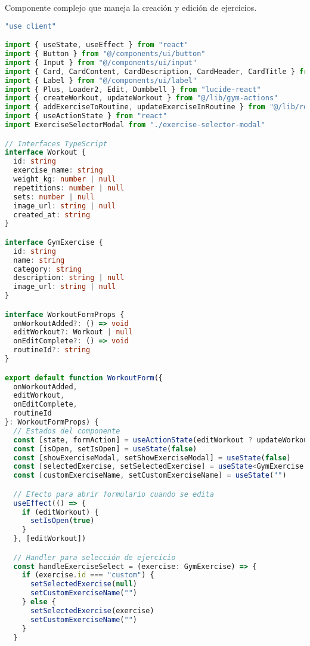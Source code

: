\documentclass[12pt,a4paper]{article}
\begin{document}
Componente complejo que maneja la creación y edición de ejercicios.

\begin{lstlisting}[language=typescript, caption=components/gym/workout-form.tsx - Estructura principal]
"use client"

import { useState, useEffect } from "react"
import { Button } from "@/components/ui/button"
import { Input } from "@/components/ui/input"
import { Card, CardContent, CardDescription, CardHeader, CardTitle } from "@/components/ui/card"
import { Label } from "@/components/ui/label"
import { Plus, Loader2, Edit, Dumbbell } from "lucide-react"
import { createWorkout, updateWorkout } from "@/lib/gym-actions"
import { addExerciseToRoutine, updateExerciseInRoutine } from "@/lib/routine-actions"
import { useActionState } from "react"
import ExerciseSelectorModal from "./exercise-selector-modal"

// Interfaces TypeScript
interface Workout {
  id: string
  exercise_name: string
  weight_kg: number | null
  repetitions: number | null
  sets: number | null
  image_url: string | null
  created_at: string
}

interface GymExercise {
  id: string
  name: string
  category: string
  description: string | null
  image_url: string | null
}

interface WorkoutFormProps {
  onWorkoutAdded?: () => void
  editWorkout?: Workout | null
  onEditComplete?: () => void
  routineId?: string
}

export default function WorkoutForm({ 
  onWorkoutAdded, 
  editWorkout, 
  onEditComplete, 
  routineId 
}: WorkoutFormProps) {
  // Estados del componente
  const [state, formAction] = useActionState(editWorkout ? updateWorkout : createWorkout, null)
  const [isOpen, setIsOpen] = useState(false)
  const [showExerciseModal, setShowExerciseModal] = useState(false)
  const [selectedExercise, setSelectedExercise] = useState<GymExercise | null>(null)
  const [customExerciseName, setCustomExerciseName] = useState("")

  // Efecto para abrir formulario cuando se edita
  useEffect(() => {
    if (editWorkout) {
      setIsOpen(true)
    }
  }, [editWorkout])

  // Handler para selección de ejercicio
  const handleExerciseSelect = (exercise: GymExercise) => {
    if (exercise.id === "custom") {
      setSelectedExercise(null)
      setCustomExerciseName("")
    } else {
      setSelectedExercise(exercise)
      setCustomExerciseName("")
    }
  }


\end{lstlisting}
\end{document}
